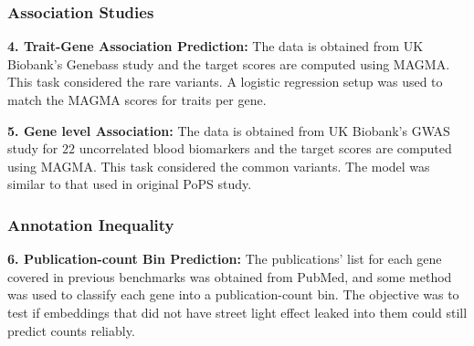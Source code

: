 \begin{sloppypar*}
    \subsubsection{Association Studies}
    \textbf{4. Trait-Gene Association Prediction:} The data is obtained from UK
    Biobank's Genebass study and the target scores are computed using MAGMA. This
    task considered the rare variants. A logistic regression setup was used to
    match the MAGMA scores for traits per gene.

    \textbf{5. Gene level Association:} The data is obtained from UK
    Biobank's GWAS study for $22$ uncorrelated blood biomarkers and the target
    scores are computed using MAGMA. This task considered the common variants.
    The model was similar to that used in original PoPS study.

    \subsubsection{Annotation Inequality}
    \textbf{6. Publication-count Bin Prediction:} The publications' list for each
    gene covered in previous benchmarks was obtained from PubMed, and some method
    was used to classify each gene into a publication-count bin. The objective was
    to test if embeddings that did not have street light effect leaked into them
    could still predict counts reliably.
    

    
\end{sloppypar*}